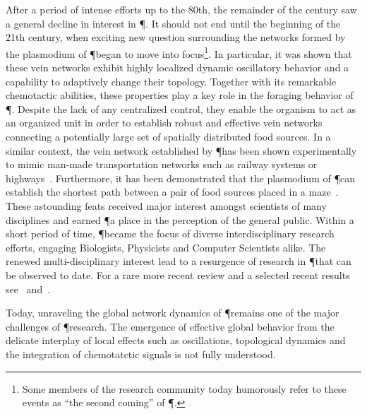		After a period of intense efforts up to the 80th, the remainder of the century saw a general decline in interest in \P. It should not end until the beginning of the 21th century, when exciting new question surrounding the networks formed by the plasmodium of \P began to move into focus\footnote{Some members of the research community today humorously refer to these events as ``the second coming'' of \P.}. In particular, it was shown that these vein networks exhibit highly localized dynamic oscillatory behavior and a capability to adaptively change their topology. Together with its remarkable chemotactic abilities, these properties play a key role in the foraging behavior of \P. Despite the lack of any centralized control, they enable the organism to act as an organized unit in order to establish robust and effective vein networks connecting a potentially large set of spatially distributed food sources. In a similar context, the vein network established by \P has been shown experimentally to mimic man-made transportation networks such as railway systems or highways~\cite{tero2010rules,tero2006physarum,nakagaki2004smart}. Furthermore, it has been demonstrated that the plasmodium of \P can establish the shortest path between a pair of food sources placed in a maze~\cite{nakagaki2000intelligence}. These astounding feats received major interest amongst scientists of many disciplines and earned \P a place in the perception of the general public. Within a short period of time, \P became the focus of diverse interdisciplinary research efforts, engaging Biologists, Physicists and Computer Scientists alike. The renewed multi-disciplinary interest lead to a resurgence of research in \P that can be observed to date. For a rare more recent review and a selected recent results see~\cite{ueda2005intelligent} and~\cite{takamatsu2009environment,shirakawa2007emergence,alim2013random,tero2007mathematical,nakagaki2004obtaining}.

		Today, unraveling the global network dynamics of \P remains one of the major challenges of \P research. The emergence of effective global behavior from the delicate interplay of local effects such as oscillations, topological dynamics and the integration of chemotatctic signals is not fully understood. 







